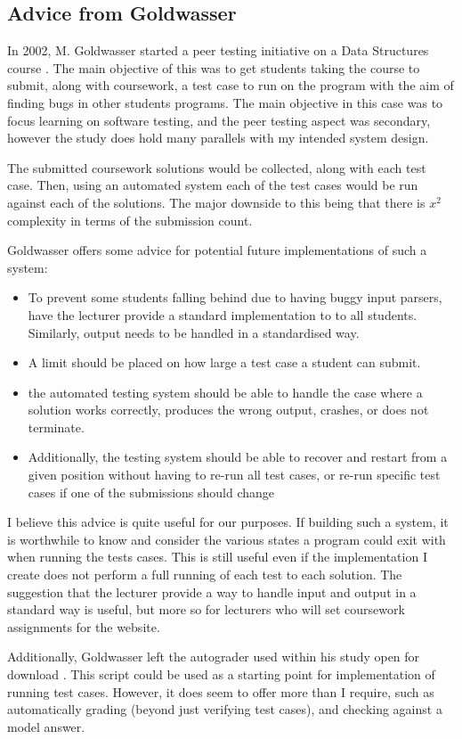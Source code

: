\documentclass[a4paper,11pt]{report}
\begin{document}
\subsection{Advice from Goldwasser}
In 2002, M. Goldwasser started a peer testing initiative on a Data Structures course \cite{goldwasser_gimmick_2002}.  The main objective of this was to get students taking the course to submit, along with coursework, a test case to run on the program with the aim of finding bugs in other students programs. The main objective in this case was to focus learning on software testing, and the peer testing aspect was secondary, however the study does hold many parallels with my intended system design.\par
The submitted coursework solutions would be collected, along with each test case. Then, using an automated system each of the test cases would be run against each of the solutions. The major downside to this being that there is $x^2$ complexity in terms of the submission count.\par
Goldwasser offers some advice for potential future implementations of such a system:
\begin{itemize}
 \item To prevent some students falling behind due to having buggy input parsers, have the lecturer provide a standard implementation to to all students. Similarly, output needs to be handled in a standardised way.
 \item A limit should be placed on how large a test case a student can submit.
 \item the automated testing system should be able to handle the case where a solution works correctly, produces the wrong output, crashes, or does not terminate.
 \item Additionally, the testing system should be able to recover and restart from a given position without having to re-run all test cases, or re-run specific test cases if one of the submissions should change
\end{itemize}
I believe this advice is quite useful for our purposes. If building such a system, it is worthwhile to know and consider the various states a program could exit with when running the tests cases. This is still useful even if the implementation I create does not perform a full running of each test to each solution. The suggestion that the lecturer provide a way to handle input and output in a standard way is useful, but more so for lecturers who will set coursework assignments for the website.\par
Additionally, Goldwasser left the autograder used within his study open for download \cite{goldwasser_autograde_2002}. This script could be used as a starting point for implementation of running test cases. However, it does seem to offer more than I require, such as automatically grading (beyond just verifying test cases), and checking against a model answer.
\end{document}
